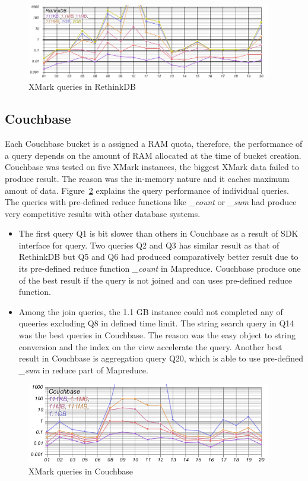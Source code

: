 \begin{figure}
	\centering
	\includegraphics[width=0.95\textwidth]{img/result/rethinkdb/rethinkdb-all}
	\caption{XMark queries in RethinkDB}
	\label{fig:xmark-result-rethinkdb-all}
\end{figure}

\subsection{Couchbase}
Each Couchbase bucket is a assigned a RAM quota,  therefore, the performance of a query depends on the amount of RAM allocated at the time of bucket creation. Couchbase was tested on five XMark instances, the biggest XMark data failed to produce result. The reason was the in-memory nature and it caches maximum amout of data.  Figure~\ref{fig:xmark-result-cb-all} explains the query performance of individual queries. The queries with pre-defined reduce functions like \textit{\_count} or \textit{\_sum} had produce very competitive results with other database systems.
\begin{itemize}
\item 

The first query Q1 is bit slower than others in Couchbase as a result of SDK interface for query. Two queries Q2 and Q3 has similar result as that of RethinkDB  but Q5 and Q6 had produced comparatively better result due to its pre-defined reduce function \textit{\_count} in Mapreduce. Couchbase produce one of the best result if the query is not joined and can uses pre-defined reduce function. 
\item Among the join queries, the 1.1 GB instance could not completed any of queeries excluding Q8 in defined time limit. 
The string search query in Q14 was the best queries in Couchbase. The reason was the easy object to string conversion and the index on the view accelerate the query. Another best result in Couchbase is aggregation query Q20, which is able to use pre-defined \textit{\_sum} in reduce part of Mapreduce. 
\end{itemize} 

\begin{figure}
	\centering
	\includegraphics[width=0.95\textwidth]{img/result/cb/cb-all-final}
	\caption{XMark queries in Couchbase}
	\label{fig:xmark-result-cb-all}
\end{figure}

